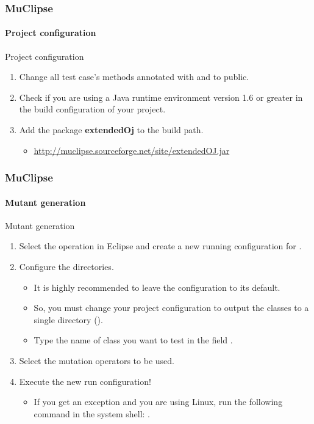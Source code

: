 \begin{frame}
\frametitle{MuClipse}
\framesubtitle{Project configuration}

\begin{block:procedure}{Project configuration}
\begin{enumerate}
	\item Change all test case's methods annotated with  and
	 to public.

	\item Check if you are using a Java runtime environment version 1.6 or
	greater in the build configuration of your project.

	\item Add the package \textbf{extendedOj} to the build path.
	\begin{itemize}
		\item \url{http://muclipse.sourceforge.net/site/extendedOJ.jar}
	\end{itemize}
\end{enumerate}
\end{block:procedure}
\end{frame}



\begin{frame}
\frametitle{MuClipse}
\framesubtitle{Mutant generation}

\begin{block:procedure}{Mutant generation}
\begin{enumerate}
	\item Select the  operation in Eclipse and create a new
	running configuration for .

	\item Configure the directories.
	\begin{itemize}
		\item It is highly recommended to leave the configuration to its
		default.

		\item So, you must change your project configuration to output the
		classes to a single directory ().

		\item Type the name of class you want to test in the field
		.
	\end{itemize}

	\item Select the mutation operators to be used.

	\item Execute the new run configuration!
	\begin{itemize}
		\item If you get an 
		exception and you are using Linux, run the following command in the
		system shell: .
	\end{itemize}
\end{enumerate}
\end{block:procedure}
\end{frame}



